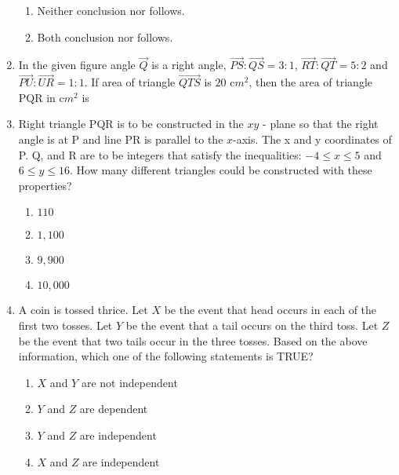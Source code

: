 \documentclass[journal,12pt,onecolumn]{IEEEtran}
\theoremstyle{remark}
\begin{document}
\begin{enumerate}
\begin{enumerate}
        \item Neither conclusion \uppercase{\expandafter{}} nor \uppercase{\expandafter{}} follows.
        \item Both conclusion \uppercase{\expandafter{}} nor \uppercase{\expandafter{}} follows.
    \end{enumerate}
    \item In the given figure angle $\vec{Q}$ is a right angle, $\vec{PS}:\vec{QS}=3:1$, $\vec{RT}:\vec{QT}=5:2$ and $\vec{PU}:\vec{UR}=1:1$. If area of triangle $\vec{QTS}$ is $20$ c$m^2$, then the area of triangle PQR in c$m^2$ is \underline{\phantom{black}}


\begin{center}
\end{center}


    \item Right triangle PQR is to be constructed in the $xy$ - plane so that the right angle is at P and line PR is parallel to the $x$-axis. The x and y coordinates of P. Q, and R are to be integers that satisfy the inequalities: $-4\leq x\leq 5$ and $6\leq y\leq 16$. How many different triangles could be constructed with these properties?
    \begin{enumerate}
    \item $110$
    \item $1,100$
    \item $9,900$
    \item $10,000$
    \end{enumerate}

    \item A coin is tossed thrice. Let $X$ be the event that head occurs in each of the first two tosses. Let $Y$ be the event that a tail occurs on the third toss. Let $Z$ be the event that two tails occur in the three tosses. Based on the above information, which one of the following statements is TRUE?
    \begin{enumerate}
    \item $X$ and $Y$ are not independent 
    \item $Y$ and $Z$ are dependent
    \item $Y$ and $Z$ are independent
    \item $X$ and $Z$ are independent
    \end{enumerate}


\end{enumerate}
\end{document}
